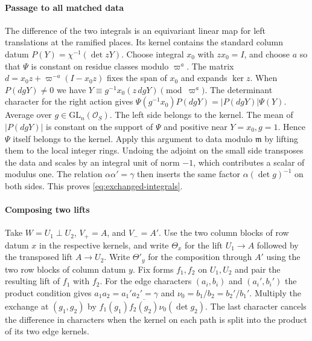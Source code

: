\paragraph{Passage to all matched data}
The difference of the two integrals is an equivariant linear map for
left translations at the ramified places. Its kernel contains the
standard column datum \(P(Y)=\chi^{-1}(\det zY)\).
Choose integral \(x_0\) with \(z x_0=I\), and choose \(a\) so that \(\Psi\)
is constant on residue classes modulo \(\varpi^a\). The matrix
\(d=x_0z+\varpi^{-a}(I-x_0z)\) fixes the span of \(x_0\) and expands \(\ker z\).
When \(P(dgY)\ne0\) we have
\(Y\equiv g^{-1}x_0(z\,dgY)\pmod{\varpi^a}\).
The determinant character for the right action gives
\(\Psi(g^{-1}x_0)P(dgY)=|P(dgY)|\Psi(Y)\).
Average over \(g\in\mathrm{GL}_n(\mathcal O_S)\). The left side belongs
to the kernel. The mean of \(|P(dgY)|\) is constant on the support of
\(\Psi\) and positive near \(Y=x_0,g=1\). Hence \(\Psi\) itself belongs to
the kernel. Apply this argument to data modulo \(\mathfrak m\) by lifting
them to the local integer rings. Undoing the adjoint on the small side
transposes the data and scales by an integral unit of norm \(-1\), which
contributes a scalar of modulus one. The relation \(\alpha\alpha'=\gamma\)
then inserts the same factor \(\alpha(\det g)^{-1}\) on both sides.
This proves \eqref{eq:exchanged-integrals}.

\paragraph{Composing two lifts}
Take \(W=U_1\perp U_2\), \(V_+=A\), and \(V_-=A'\).
Use the two column blocks of row datum \(x\) in the respective kernels,
and write \(\Theta_x\) for the lift \(U_1\to A\) followed by the transposed
lift \(A\to U_2\). Write \(\Theta'_y\) for the composition through \(A'\)
using the two row blocks of column datum \(y\).
Fix forms \(f_1,f_2\) on \(U_1,U_2\) and pair the resulting lift of \(f_1\)
with \(f_2\). For the edge characters \((a_i,b_i)\) and \((a_i',b_i')\)
the product condition gives \(a_1a_2=a_1'a_2'=\gamma\) and
\(\nu_0=b_1/b_2=b_2'/b_1'\). Multiply the exchange at \((g_1,g_2)\) by
\(f_1(g_1)\overline{f_2(g_2)}\nu_0(\det g_2)\).
The last character cancels the difference in characters when the kernel
on each path is split into the product of its two edge kernels.


